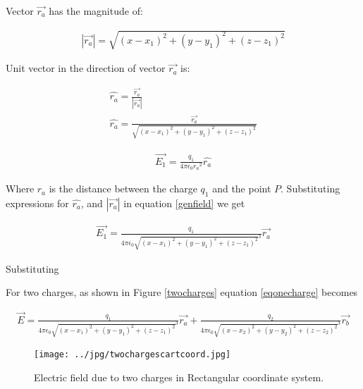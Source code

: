 Vector $\vec{r_a}$ has the magnitude of:


\begin{eqnarray}
|\vec{r_a}|= \sqrt{(x - x_1)^2 +(y - y_1)^2 +(z - z_1)^2}
\end{eqnarray}

Unit vector in the direction of vector $\vec{r_a}$ is:


\begin{eqnarray}
\hat{r_a}= \frac{\vec{r_a}}{|\vec{r_a}|} \\
\hat{r_a}=\frac{\vec{r_a}}{\sqrt{(x - x_1)^2 +(y - y_1)^2 +(z - z_1)^2}}
\end{eqnarray}



\begin{eqnarray}
\vec{E_1}=\frac{q_1}{4 \pi \epsilon_{0} {r_a}^2} \hat{r_a}
\end{eqnarray}

Where $r_a$ is the distance between the charge $q_1$ and the point $P$. Substituting expressions for $\hat{r_a}$, and $|\vec{r_a}|$ in equation \ref{genfield} we get

 



\begin{eqnarray}
\vec{E_1}=\frac{q_1}{4 \pi \epsilon_{0} {\sqrt{(x - x_1)^2 +(y - y_1)^2 +(z - z_1)^2}
}^3} \vec{r_a} \label{eqonecharge}
\end{eqnarray}

Substituting 


For two charges, as shown in Figure \ref{twocharges} equation \ref{eqonecharge} becomes

\begin{eqnarray}
\vec{E}= \frac{q_1}{4 \pi \epsilon_{0} {\sqrt{(x - x_1)^2 +(y - y_1)^2 +(z - z_1)^2}
}^3} \vec{r_a} + \frac{q_2}{4 \pi \epsilon_{0} {\sqrt{(x - x_2)^2 +(y - y_2)^2 +(z - z_2)^2}
}^3} \vec{r_b} 
\end{eqnarray}


\begin{figure}[htbp]
\begin{center}
\texttt{[image: ../jpg/twochargescartcoord.jpg]}
\end{center}
\caption{Electric field due to two charges in  Rectangular coordinate system.}
\label{singlecharge}
\end{figure}










